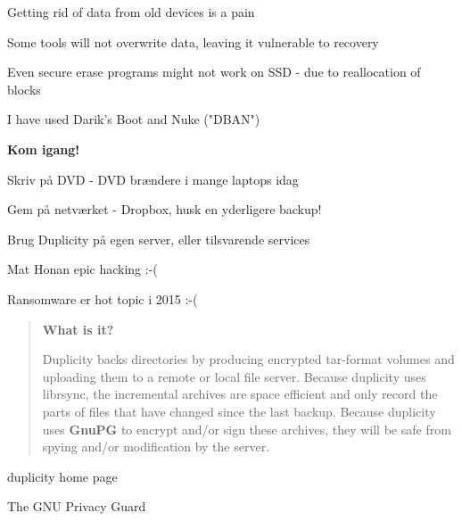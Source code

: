 \documentclass[20pt,landscape,a4paper,footrule]{foils}
\begin{document}


\begin{list1}
\item Getting rid of data from old devices is a pain
\item Some tools will not overwrite data, leaving it vulnerable to recovery
\item Even secure erase programs might not work on SSD - due to reallocation of blocks
\item I have used Darik's Boot and Nuke ("DBAN") 
\end{list1}






\vskip 3cm
\centerline{\LARGE \bf Kom igang!}

\begin{list2}
\item Skriv på DVD - DVD brændere i mange laptops idag
\item Gem på netværket - Dropbox, husk en yderligere backup!
\item Brug Duplicity på egen server, eller tilsvarende services
\end{list2}

Mat Honan epic hacking :-(\\ {\small{}}

Ransomware er hot topic i 2015 :-(



\begin{quote}
{\large\bf What is it?}

Duplicity backs directories by producing encrypted tar-format volumes and uploading them to a remote or local file server. Because duplicity uses librsync, the incremental archives are space efficient and only record the parts of files that have changed since the last backup. Because duplicity uses {\bf GnuPG} to encrypt and/or sign these archives, they will be safe from spying and/or modification by the server.
\end{quote}

 duplicity home page

 The GNU Privacy Guard


\end{document}
